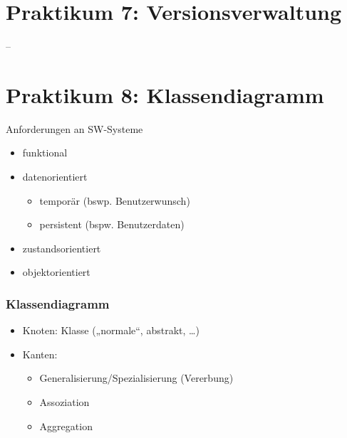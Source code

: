 \chapter{Praktikum 7: Versionsverwaltung}
--

\chapter{Praktikum 8: Klassendiagramm}
Anforderungen an SW-Systeme
\begin{itemize}
\item funktional
\item datenorientiert
\begin{itemize}
\item temporär (bswp. Benutzerwunsch)
\item persistent (bspw. Benutzerdaten)
\end{itemize}
\item zustandsorientiert
\item objektorientiert
\end{itemize}

\subsection*{Klassendiagramm}
\begin{itemize}
\item Knoten: Klasse („normale“, abstrakt, …)
\item Kanten:
\begin{itemize}
\item Generalisierung/Spezialisierung (Vererbung)
\item Assoziation
\item Aggregation
\end{itemize}
\end{itemize}






